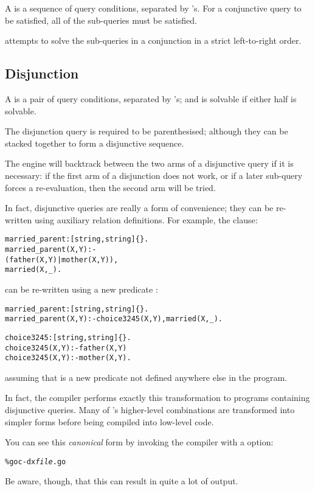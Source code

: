 A  is a sequence of query conditions, separated by \q{,}'s. For a conjunctive query to be satisfied, all of the sub-queries must be satisfied.

\go attempts to solve the sub-queries in a conjunction in a strict left-to-right order.

\subsection{Disjunction}
\label{goal:disjunction}

A  is a pair of query conditions, separated by \q{|}'s; and is solvable if either half is solvable. 

The disjunction query is required to be parenthesised; although they can be stacked together to form a disjunctive sequence. 

The \go engine will backtrack between the two arms of a disjunctive query if it is necessary: if the first arm of a disjunction does not work, or if a later sub-query forces a re-evaluation, then the second arm will be tried.

In fact, disjunctive queries are really a form of convenience; they can be re-written using auxiliary relation definitions. For example, the clause:
\begin{alltt}
married\_parent:[string,string]\{\}.
married\_parent(X,Y) :-
    ( father(X,Y) | mother(X,Y)),
    married(X,\_).
\end{alltt}
can be re-written using a new predicate :
\begin{alltt}
married\_parent:[string,string]\{\}.
married\_parent(X,Y) :- choice3245(X,Y), married(X,\_).

choice3245:[string,string]\{\}.
choice3245(X,Y) :- father(X,Y)
choice3245(X,Y) :- mother(X,Y).
\end{alltt}
assuming that  is a new predicate not defined anywhere else in the program.
\begin{aside}
In fact, the \go compiler performs exactly this transformation to programs containing disjunctive queries. Many of \go's higher-level combinations are transformed into simpler forms before being compiled into low-level code.

You can see this \emph{canonical} form by invoking the \go compiler  with a  option:
\begin{alltt}
\% goc -dx \emph{file}.go
\end{alltt}
Be aware, though, that this can result in quite a lot of output.
\end{aside}

